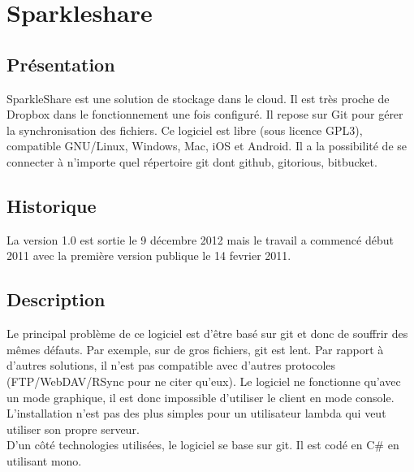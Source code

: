 \chapter{Sparkleshare}
\thispagestyle{EIP} %
\section{Présentation}
SparkleShare est une solution de stockage dans le cloud. Il est très proche de Dropbox dans le fonctionnement une fois configuré. Il repose sur Git pour gérer la synchronisation des fichiers. Ce logiciel est libre (sous licence GPL3), compatible GNU/Linux, Windows, Mac, iOS et Android. Il a la possibilité de se connecter à n'importe quel répertoire git dont github, gitorious, bitbucket.\\

\section{Historique}
La version 1.0 est sortie le 9 décembre 2012 mais le travail a commencé début 2011 avec la première version publique le 14 fevrier 2011.\\

\section{Description}
Le principal problème de ce logiciel est d'être basé sur git et donc de souffrir des mêmes défauts. Par exemple, sur de gros fichiers, git est lent. Par rapport à d'autres solutions, il n'est pas compatible avec d'autres protocoles (FTP/WebDAV/RSync pour ne citer qu'eux). Le logiciel ne fonctionne qu'avec un mode graphique, il est donc impossible d'utiliser le client en mode console. L'installation n'est pas des plus simples pour un utilisateur lambda qui veut utiliser son propre serveur.\\

D'un côté technologies utilisées, le logiciel se base sur git. Il est codé en C\# en utilisant mono.\\
